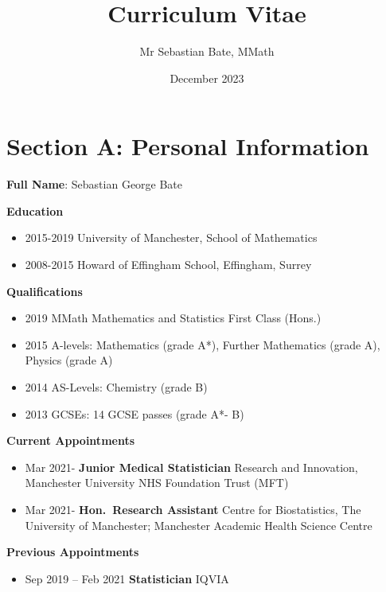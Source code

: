 \documentclass[
]{article}
\title{Curriculum Vitae}
\author{Mr Sebastian Bate, MMath}
\date{December 2023}
\providecommand{\tightlist}{%
  \setlength{\itemsep}{0pt}\setlength{\parskip}{0pt}}
\begin{document}
\maketitle

\hypertarget{section-a-personal-information}{%
\section{Section A: Personal
Information}\label{section-a-personal-information}}

\textbf{Full Name}: Sebastian George Bate

\textbf{Education}

\begin{itemize}
\tightlist
\item
  2015-2019 University of Manchester, School of Mathematics
\item
  2008-2015 Howard of Effingham School, Effingham, Surrey
\end{itemize}

\textbf{Qualifications}

\begin{itemize}
\tightlist
\item
  2019 MMath Mathematics and Statistics First Class (Hons.)
\item
  2015 A-levels: Mathematics (grade A*), Further Mathematics (grade A),
  Physics (grade A)
\item
  2014 AS-Levels: Chemistry (grade B)
\item
  2013 GCSEs: 14 GCSE passes (grade A*- B)
\end{itemize}

\textbf{Current Appointments}

\begin{itemize}
\item
  Mar 2021- \textbf{Junior Medical Statistician} Research and
  Innovation, Manchester University NHS Foundation Trust (MFT)
\item
  Mar 2021- \textbf{Hon.~Research Assistant} Centre for Biostatistics,
  The University of Manchester; Manchester Academic Health Science
  Centre
\end{itemize}

\textbf{Previous Appointments}

\begin{itemize}
\tightlist
\item
  Sep 2019 -- Feb 2021 \textbf{Statistician} IQVIA
\end{itemize}
\end{document}
